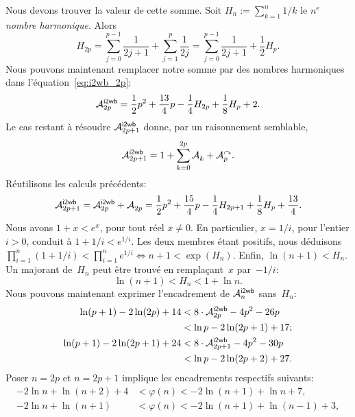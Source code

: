 Nous devons trouver la valeur de cette somme. Soit \(H_n :=
\sum_{k=1}^n{1/k}\) le \(n^\text{e}\) \emph{nombre
  harmonique}. Alors
\begin{equation*}
H_{2p} = \sum_{j=0}^{p-1}{\frac{1}{2j+1}} + \sum_{j=1}^{p}{\frac{1}{2j}}
      = \sum_{j=0}^{p-1}{\frac{1}{2j+1}} + \frac{1}{2}{H_{p}}.
\end{equation*}
Nous pouvons maintenant remplacer notre somme par des nombres
harmoniques dans l'équation~\eqref{eq:i2wb_2p}:
\begin{equation*}
\M{\fun{i2wb}}{2p}
  = \frac{1}{2}{p^2} + \frac{13}{4}{p} - \frac{1}{4}{H_{2p}}
    + \frac{1}{8}{H_p} + 2.
\end{equation*}
Le cas restant à résoudre \(\M{\fun{i2wb}}{2p+1}\) donne, par un
raisonnement semblable,
\begin{equation*}
\M{\fun{i2wb}}{2p+1}
  = 1 + \sum_{k=0}^{2p}{\M{}{k}} + \M{\curvearrowright}{p}.
\end{equation*}
Réutilisons les calculs précédents:
\begin{equation*}
\M{\fun{i2wb}}{2p+1}
   = \M{\fun{i2wb}}{2p} + \M{}{2p}
   = \frac{1}{2}{p^2} + \frac{15}{4}{p} - \frac{1}{4}{H_{2p+1}}
     + \frac{1}{8}{H_p} + \frac{13}{4}.
\end{equation*}
Nous avons \(1 + x < e^x\), pour tout réel \(x \neq 0\). En
particulier, \(x=1/i\), pour l'entier \(i>0\), conduit à \(1 + 1/i <
e^{1/i}\). Les deux membres étant positifs, nous déduisons
\(\prod_{i=1}^{n}(1+1/i) < \prod_{i=1}^{n}{e^{1/i}} \Leftrightarrow
n+1 < \exp(H_n)\). Enfin, \(\ln(n+1) < H_n\). Un majorant de~\(H_n\)
peut être trouvé en remplaçant~\(x\) par~\(-1/i\):
\begin{equation}
\ln(n+1) < H_n < 1 + \ln n.\label{ineq:Hn}
\end{equation}
Nous pouvons maintenant exprimer l'encadrement de
\(\M{\fun{i2wb}}{n}\) sans~\(H_n\):
\begin{align*}
\ln(p+1) - 2\ln(2p) + 14
&< 8 \cdot \M{\fun{i2wb}}{2p} - 4{p^2} - 26{p}\\
& < \ln p - 2\ln(2p+1) + 17;\\
\ln(p+1) - 2\ln(2p+1) + 24
&< 8 \cdot \M{\fun{i2wb}}{2p+1} - 4{p^2} - 30{p}\\
&< \ln{p} - 2\ln(2p+2) + 27.
\end{align*}
Poser \(n=2p\) et \(n=2p+1\) implique les encadrements respectifs
suivants:
\begin{align*}
-2\ln n + \ln(n+2) + 4 &< \varphi(n) < -2\ln(n+1) + \ln n + 7,\\
-2\ln n + \ln(n+1)     &< \varphi(n) < -2\ln(n+1) + \ln(n-1) + 3,
\end{align*}

